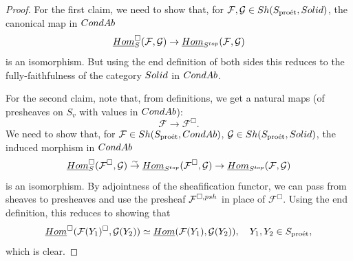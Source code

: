 \documentclass[10pt,a4paper]{amsart}
\newcommand{\proeet}{\operatorname{pro\acute{e}t} }
\newcommand{\sff}{{\mathcal{F}}}
\newcommand{\sg}{{\mathcal{G}}}
\newcommand{\uHom}{\underline{{\rm{Hom}} }}
\begin{document}
 \begin{proof}For the first claim, we need to show that, for $\sff, \sg \in {\rm Sh}(S_{\proeet},{\rm Solid})$,  the canonical map in ${\rm CondAb}$
 $$
 \uHom^{\Box}_{S}(\sff,\sg)\to  \uHom_{S^{\rm top}}(\sff,\sg)
 $$
 is an isomorphism. But using the end definition of both sides this reduces to the fully-faithfulness of the category ${\rm Solid}$ in ${\rm CondAb}$.
 
    For the second claim, note that,  from definitions, we get a natural maps (of presheaves on $S_v$ with values in ${\rm CondAb}$):
 $$
 \sff\to \sff^{\Box}. 
 $$
 We need to show that, for $\sff\in {\rm Sh}(S_{\proeet},{\rm CondAb})$,
$\sg \in {\rm Sh}(S_{\proeet},{\rm Solid})$, the induced morphism in ${\rm CondAb}$
 $$
\uHom^{\Box}_{S}(\sff^{\Box},\sg)\stackrel{\sim}{\to}  \uHom_{S^{\rm top}}(\sff^{\Box},\sg) \to \uHom_{S^{\rm top}}(\sff,\sg) 
 $$
 is an isomorphism. 
 By adjointness of the sheafification functor, we can pass from sheaves to presheaves and  use the presheaf ${\sff}^{\Box,{\rm psh}}$ in place of $\sff^{\Box}$. Using the end definition, this reduces to showing that
 $$
  \uHom^{\Box}({\sff}(Y_1)^{\Box},\sg(Y_2))\simeq \uHom(\sff(Y_1),\sg(Y_2)),\quad Y_1, Y_2\in S_{\proeet},
 $$
 which is clear. 
  \end{proof}
\end{document}

